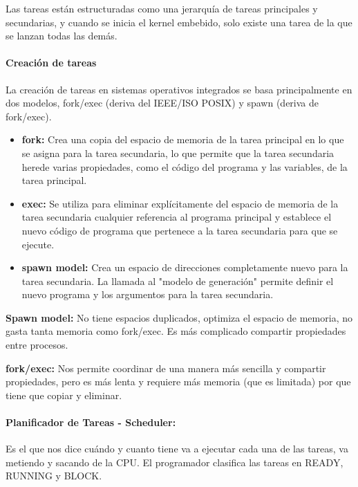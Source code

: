 \documentclass[12pt]{report} %
\begin{document}
\begin{description}
	Las tareas están estructuradas como una jerarquía de tareas principales y secundarias, y cuando se inicia el kernel embebido, solo existe una tarea de la que se lanzan todas las demás.
	
	
	\paragraph{Creación de tareas}
	La creación de tareas en sistemas operativos integrados se basa principalmente en dos modelos, fork/exec (deriva del IEEE/ISO POSIX) y spawn (deriva de fork/exec).

	\begin{itemize}
		\item \textbf{fork:} Crea una copia del espacio de memoria de la tarea principal en lo que se asigna para la tarea secundaria, lo que permite que la tarea secundaria herede varias propiedades, como el código del programa y las variables, de la tarea principal.
		\item \textbf{exec:} Se utiliza para eliminar explícitamente del espacio de memoria de la tarea secundaria cualquier referencia al programa principal y establece el nuevo código de programa que pertenece a la tarea secundaria para que se ejecute.
		\item \textbf{spawn model:} Crea un espacio de direcciones completamente nuevo para la tarea secundaria. La llamada al "modelo de generación" permite definir el nuevo programa y los argumentos para la tarea secundaria. 
	\end{itemize}

	\textbf{Spawn model:} No tiene espacios duplicados, optimiza el espacio de memoria, no gasta tanta memoria como fork/exec. Es más complicado compartir propiedades entre procesos.
	
	\textbf{fork/exec:} Nos permite coordinar de una manera más sencilla y compartir propiedades, pero es más lenta y requiere más memoria (que es limitada) por que tiene que copiar y eliminar.
	
	\paragraph{Planificador de Tareas - Scheduler:} Es el que nos dice cuándo y cuanto tiene va a ejecutar cada una de las tareas, va metiendo y sacando de la CPU. El programador clasifica las tareas en READY, RUNNING y BLOCK.
	

\end{description}
\end{document}
